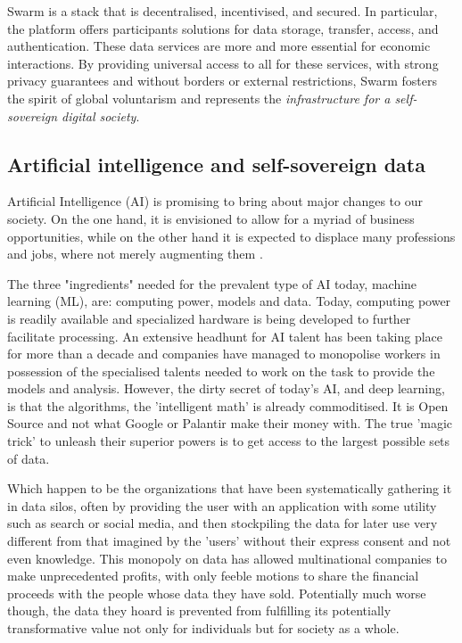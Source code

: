 Swarm is a  stack that is decentralised, incentivised, and secured. In particular, the platform offers participants solutions for data storage, transfer, access, and authentication. These data services are more and more essential for economic interactions. By providing universal access to all for these services, with strong privacy guarantees and without borders or external restrictions, Swarm fosters the spirit of global voluntarism and represents the \emph{infrastructure for a self-sovereign digital society}.

\subsection{Artificial intelligence and self-sovereign data \statusgreen} \label{sec:AIdata}

Artificial Intelligence (AI) is promising to bring about major changes to our society. On the one hand, it is envisioned to allow for a myriad of business opportunities, while on the other hand it is expected to displace many professions and jobs, where not merely augmenting them \cite{Lee2018Sep}.

The three "ingredients" needed for the prevalent type of AI today, machine learning (ML), are: computing power, models and data. Today, computing power is readily available and specialized hardware is being developed to further facilitate processing. An extensive headhunt for AI talent has been taking place for more than a decade and companies have  managed to monopolise workers in possession of the specialised talents needed to work on the task to provide the models and analysis. However, the dirty secret of today's AI, and deep learning, is that the algorithms, the 'intelligent math' is already commoditised. It is Open Source and not what Google or Palantir make their money with. The true 'magic trick' to unleash their superior powers is to get access to the largest possible sets of data.

Which happen to be the organizations that have been systematically gathering it in data silos, often by providing the user with an application with some utility such as search or social media, and then stockpiling the data for later use very different from that imagined by the 'users' without their express consent and not even knowledge. This monopoly on data has allowed multinational companies to make unprecedented profits, with only feeble motions to share the financial proceeds with the people whose data they have sold. Potentially much worse though, the data they hoard is prevented from fulfilling its potentially transformative value not only for individuals but for society as a whole.


